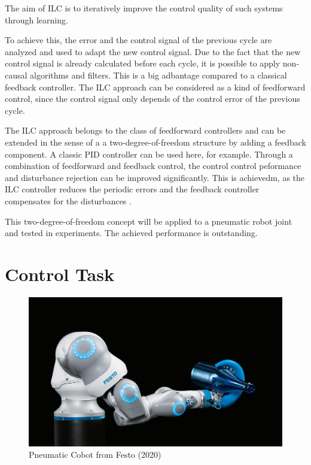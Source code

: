 \documentclass[conference]{IEEEtran}
\begin{document}
The aim of ILC is to iteratively improve the control quality of such
systems through learning.

To achieve this, the error and the control signal of the previous
cycle are analyzed and used to adapt the new control signal. Due to
the fact that the new control signal is already calculated before each
cycle, it is possible to apply non-causal algorithms and filters.
This is a big adbantage compared to a classical feedback controller.
The ILC approach can be considered as a kind of feedforward control,
since the control signal only depends of the control error of the
previous cycle.

The ILC approach belongs to the class of feedforward controllers and
can be extended in the sense of a a two-degree-of-freedom structure by
adding a feedback component.  A classic PID controller can be used
here, for example. Through a combination of feedforward and feedback
control, the control control peformance and disturbance rejection can
be improved significantly. This is achievedm, as the ILC controller
reduces the periodic errors and the feedback controller compensates
for the disturbances \cite{ILCGlueck2015}.

This two-degree-of-freedom concept will be applied to a pneumatic
robot joint and tested in experiments. The achieved performance is
outstanding.



\section{Control Task}

\begin{figure}[htbp]
  \centerline{\includegraphics[width=\columnwidth]{./pictures/octopusgripper.jpg}}
\caption{Pneumatic Cobot from Festo (2020)}
\label{fig:Octopus}
\end{figure}
\end{document}
